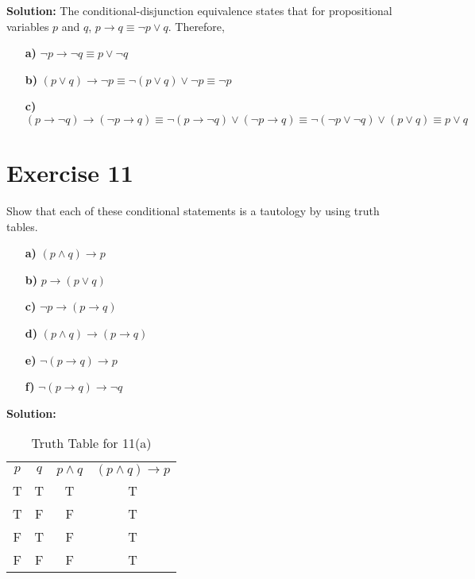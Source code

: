 \documentclass{Axon}
\begin{document}
\noindent
\textbf{Solution:}
The conditional-disjunction equivalence states that for propositional variables \(p\) and \(q\), \(p \to q \equiv \lnot p \lor q\). Therefore,
\begin{enumerate}
    \item[\textbf{a)}] \(\lnot p \to \lnot q \equiv p \lor \lnot q\)
    \item[\textbf{b)}] \((p \lor q) \to \lnot p \equiv \lnot(p \lor q) \lor \lnot p \equiv \lnot p\)
    \item[\textbf{c)}] \((p \to \lnot q) \to (\lnot p \to q) \equiv \lnot(p \to \lnot q) \lor (\lnot p \to q) \equiv \lnot(\lnot p \lor \lnot q) \lor (p \lor q) \equiv p \lor q\)
\end{enumerate}

\section*{Exercise 11}
Show that each of these conditional statements is a tautology by using truth tables.
\begin{enumerate}
    \item[\textbf{a)}] \((p \land q) \to p\)
    \item[\textbf{b)}] \(p \to (p \lor q)\)
    \item[\textbf{c)}] \(\lnot p \to (p \to q)\)
    \item[\textbf{d)}] \((p \land q) \to (p \to q)\)
    \item[\textbf{e)}] \(\lnot(p \to q) \to p\)
    \item[\textbf{f)}] \(\lnot(p \to q) \to \lnot q\)
\end{enumerate}

\noindent
\textbf{Solution:}

\begin{table}[ht]
    \centering
    \begin{tabular}{c|c|c|c}
        \(p\) & \(q\) & \(p \land q\) & \((p \land q) \to p\) \\
        T     & T     & T             & T                     \\
        T     & F     & F             & T                     \\
        F     & T     & F             & T                     \\
        F     & F     & F             & T
    \end{tabular}
    \caption{Truth Table for 11(a)}
\end{table}
\end{document}
